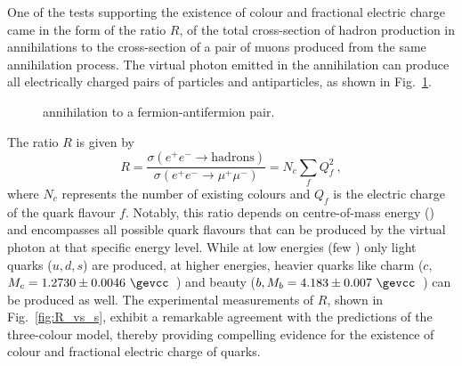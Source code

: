 One of the tests supporting the existence of colour and fractional electric charge came in the form of the ratio $R$, of the total cross-section of hadron production in \ee annihilations to the cross-section of a pair of muons produced from the same annihilation process. The virtual photon emitted in the annihilation can produce all electrically charged pairs of particles and antiparticles, as shown in Fig.~\ref{fig:ee_to_ff_diagram}.

\begin{figure}[htb]
  \centering
\caption{\ee annihilation to a fermion-antifermion pair.}
  \label{fig:ee_to_ff_diagram}
\end{figure}

The ratio $R$ is given by
\begin{equation*}
    R = \frac{\sigma(e^+e^- \rightarrow \mathrm{hadrons})}{\sigma(e^+e^- \rightarrow \mu^+\mu^-)} = N_c \sum_f Q_f^2\ ,
\end{equation*}
where $N_c$ represents the number of existing colours and $Q_f$ is the electric charge of the quark flavour $f$. Notably, this ratio depends on centre-of-mass energy (\sqs) and encompasses all possible quark flavours that can be produced by the virtual photon at that specific energy level. While at low energies (few \gev) only light quarks ($u,d,s$) are produced, at higher energies, heavier quarks like charm ($c$, \mbox{$M_c=1.2730\pm0.0046~\gevcc$}~\cite{pdg}) and beauty ($b, M_b=4.183\pm0.007~\gevcc$~\cite{pdg}) can be produced as well. The experimental measurements of $R$, shown in Fig.~\ref{fig:R_vs_s}, exhibit a remarkable agreement with the predictions of the three-colour model, thereby providing compelling evidence for the existence of colour and fractional electric charge of quarks.

